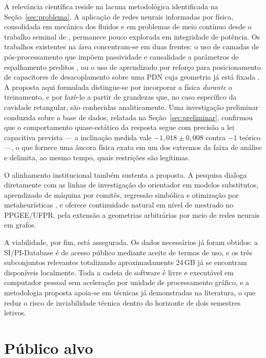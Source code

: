 A relevância científica reside na lacuna metodológica identificada na
Seção~\ref{sec:problema}. A aplicação de redes neurais informadas por física,
consolidada em mecânica dos fluidos e em problemas de meio contínuo desde o
trabalho seminal de \citet{raissi2019}, permanece pouco explorada em integridade
de potência. Os trabalhos existentes na área concentram-se em duas frentes: o uso
de camadas de pós-processamento que impõem passividade e causalidade a
parâmetros de espalhamento preditos \citep{torun2020}, ou o uso de
aprendizado por reforço para posicionamento de capacitores de desacoplamento
sobre uma PDN cuja geometria já está fixada \citep{zhang2020decap,duan2024}. A
proposta aqui formulada distingue-se por incorporar a física \emph{durante} o
treinamento, e por fazê-lo a partir de grandezas que, no caso específico da
cavidade retangular, são conhecidas analiticamente. Uma investigação preliminar
conduzida sobre a base de dados, relatada na Seção~\ref{sec:preliminar},
confirmou que o comportamento quase-estático da resposta segue com precisão a lei
capacitiva prevista — a inclinação medida vale $-1{,}018 \pm 0{,}008$ contra $-1$
teórico —, o que fornece uma âncora física exata em um dos extremos da faixa de
análise e delimita, ao mesmo tempo, quais restrições são legítimas.

O alinhamento institucional também sustenta a proposta. A pesquisa dialoga
diretamente com as linhas de investigação do orientador em modelos substitutos,
aprendizado de máquina por comitês, regressão simbólica e otimização por
metaheurísticas \citep{tessaro2026,takara2026,coelho2010}, e oferece continuidade
natural em nível de mestrado no PPGEE/UFPR, pela extensão a geometrias arbitrárias
por meio de redes neurais em grafos.

A viabilidade, por fim, está assegurada. Os dados necessários já foram obtidos: a
SI/PI-Database é de acesso público mediante aceite de termos de uso, e os três
subconjuntos relevantes totalizando aproximadamente 24\,GB já se encontram
disponíveis localmente. Toda a cadeia de software é livre e executável em
computador pessoal sem aceleração por unidade de processamento gráfico, e a
metodologia proposta apoia-se em técnicas já demonstradas na literatura, o que
reduz o risco de inviabilidade técnica dentro do horizonte de dois semestres
letivos.

\section{Público alvo}
\label{sec:publico_alvo}

